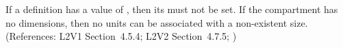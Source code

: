 If a \Compartment definition has a  value
of , then its   must not be set. If the
compartment has no dimensions, then no units can be associated
with a non-existent size.  (References: L2V1 Section~4.5.4;
L2V2 Section~4.7.5; )
